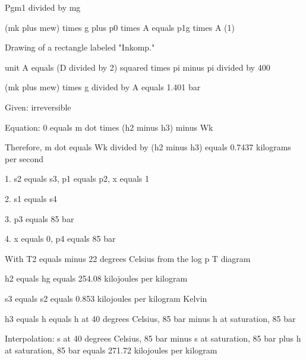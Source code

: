 Pgm1 divided by mg

(mk plus mew) times g plus p0 times A equals p1g times A (1)

Drawing of a rectangle labeled "Inkomp."

unit A equals (D divided by 2) squared times pi minus pi divided by 400

(mk plus mew) times g divided by A equals 1.401 bar

Given: irreversible

Equation: 0 equals m dot times (h2 minus h3) minus Wk

Therefore, m dot equals Wk divided by (h2 minus h3) equals 0.7437 kilograms per second

1. s2 equals s3, p1 equals p2, x equals 1

2. s1 equals s4

3. p3 equals 85 bar

4. x equals 0, p4 equals 85 bar

With T2 equals minus 22 degrees Celsius from the log p T diagram

h2 equals hg equals 254.08 kilojoules per kilogram

s3 equals s2 equals 0.853 kilojoules per kilogram Kelvin

h3 equals h equals h at 40 degrees Celsius, 85 bar minus h at saturation, 85 bar

Interpolation: s at 40 degrees Celsius, 85 bar minus s at saturation, 85 bar plus h at saturation, 85 bar equals 271.72 kilojoules per kilogram